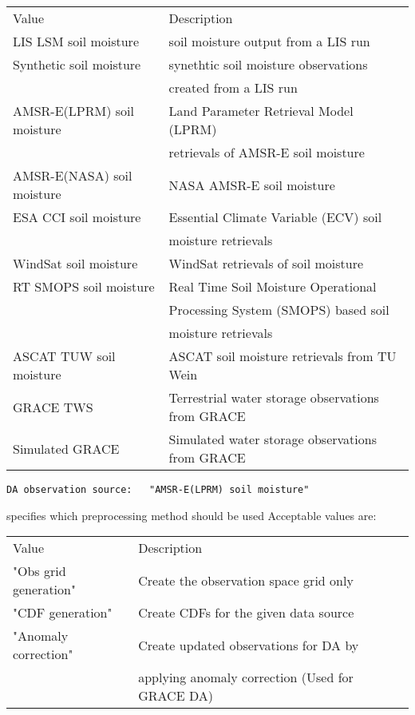  \begin{tabular}{ll}
 Value                      & Description                           \\
 LIS LSM soil moisture      & soil moisture output from a LIS run   \\
 Synthetic soil moisture    & synethtic soil moisture observations  \\
                            & created from a LIS run                \\
 AMSR-E(LPRM) soil moisture & Land Parameter Retrieval Model (LPRM) \\
                            & retrievals of AMSR-E soil moisture    \\
 AMSR-E(NASA) soil moisture & NASA AMSR-E soil moisture             \\
 ESA CCI soil moisture      & Essential Climate Variable (ECV) soil \\
                            & moisture retrievals                   \\
 WindSat soil moisture      & WindSat retrievals of soil moisture   \\
 RT SMOPS soil moisture     & Real Time Soil Moisture Operational   \\
                            & Processing System (SMOPS) based soil  \\
                            & moisture retrievals                   \\
 ASCAT TUW soil moisture    & ASCAT soil moisture retrievals from
                              TU Wein                               \\
 GRACE TWS                  & Terrestrial water storage observations
                              from GRACE                            \\ 
 Simulated GRACE            & Simulated water storage observations
                              from GRACE                            \\ 
 \end{tabular} 
 

 \begin{Verbatim}[frame=single]
DA observation source:   "AMSR-E(LPRM) soil moisture"
 \end{Verbatim}

 
 specifies which preprocessing method should be used
 Acceptable values are:

 \begin{tabular}{ll}
 Value     & Description                                  \\
 "Obs grid generation"  & Create the observation space grid only \\
 "CDF generation"       & Create CDFs for the given data source \\
 "Anomaly correction"   & Create updated observations for DA by \\
                        & applying anomaly correction (Used for GRACE DA)\\
 \end{tabular}

